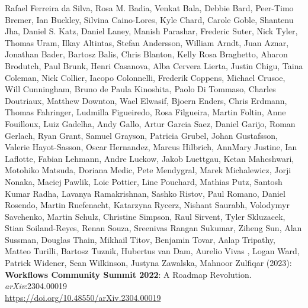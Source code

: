 \documentclass[10pt,letterpaper]{article}
\begin{document}
\begin{thebibliography}{10}
\begin{small}
Rafael Ferreira da Silva, Rosa M. Badia, Venkat Bala, Debbie Bard, Peer-Timo Bremer, Ian Buckley, Silvina Caino-Lores, Kyle Chard, Carole Goble, Shantenu Jha, Daniel S. Katz, Daniel Laney, Manish Parashar, Frederic Suter, Nick Tyler, Thomas Uram, Ilkay Altintas, Stefan Andersson, William Arndt, Juan Aznar, Jonathan Bader, Bartosz Balis, Chris Blanton, Kelly Rosa Braghetto, Aharon Brodutch, Paul Brunk, Henri Casanova, Alba Cervera Lierta, Justin Chigu, Taina Coleman, Nick Collier, Iacopo Colonnelli, Frederik Coppens, Michael Crusoe, Will Cunningham, Bruno de Paula Kinoshita, Paolo Di Tommaso, Charles Doutriaux, Matthew Downton, Wael Elwasif, Bjoern Enders, Chris Erdmann, Thomas Fahringer, Ludmilla Figueiredo, Rosa Filgueira, Martin Foltin, Anne Fouilloux, Luiz Gadelha, Andy Gallo, Artur Garcia Saez, Daniel Garijo, Roman Gerlach, Ryan Grant, Samuel Grayson, Patricia Grubel, Johan Gustafsson, Valerie Hayot-Sasson, Oscar Hernandez, Marcus Hilbrich, AnnMary Justine, Ian Laflotte, Fabian Lehmann, Andre Luckow, Jakob Luettgau, Ketan Maheshwari, Motohiko Matsuda, Doriana Medic, Pete Mendygral, Marek Michalewicz, Jorji Nonaka, Maciej Pawlik, Loic Pottier, Line Pouchard, Mathias Putz, Santosh Kumar Radha, Lavanya Ramakrishnan, Sashko Ristov, Paul Romano, Daniel Rosendo, Martin Ruefenacht, Katarzyna Rycerz, Nishant Saurabh, Volodymyr Savchenko, Martin Schulz, Christine Simpson, Raul Sirvent, Tyler Skluzacek, Stian Soiland-Reyes, Renan Souza, Sreenivas Rangan Sukumar, Ziheng Sun, Alan Sussman, Douglas Thain, Mikhail Titov, Benjamin Tovar, Aalap Tripathy, Matteo Turilli, Bartosz Tuznik, Hubertus van Dam, Aurelio Vivas , Logan Ward, Patrick Widener, Sean Wilkinson, Justyna Zawalska, Mahnoor Zulfiqar (2023):\\
\textbf{Workflows Community Summit 2022}: A Roadmap Revolution.\\
\emph{arXiv}:2304.00019\\
\url{https://doi.org/10.48550/arXiv.2304.00019}


\end{small}
\end{thebibliography}
\end{document}

